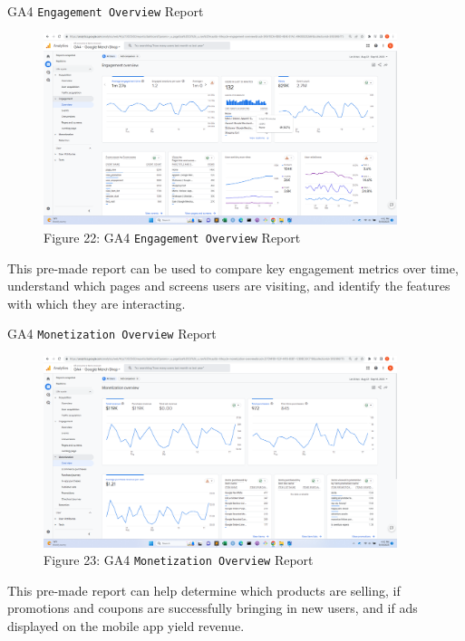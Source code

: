 \documentclass[pdf]{beamer}
\theoremstyle{remark}
\theoremstyle{definition}
\begin{document}
\begin{frame}[t]{GA4 \texttt{Engagement Overview} Report}
\begin{figure}[htbp]
  \captionsetup{justification=centering}
  \includegraphics[height=5.6cm, trim=1.5cm 0.0cm 2.0cm 0.0cm width=5.6cm]{Images/G4A_8b_091923_Engagement_Overview.png}
  \caption{Figure {\color{franklinblue} 22}: GA4 \texttt{Engagement Overview} Report}
\end{figure}
\vspace{-2.0ex}
\small 
This pre-made report can be used to compare key engagement metrics over time, understand which pages and screens users are visiting, and identify the features with which they are interacting.
\end{frame}

\begin{frame}[t]{GA4 \texttt{Monetization Overview} Report}
\begin{figure}[htbp]
  \captionsetup{justification=centering}
  \includegraphics[height=5.6cm, trim=1.5cm 0.0cm 2.0cm 0.0cm width=5.6cm]{Images/G4A_8c_091923_Monetization_Overview.png}
  \caption{Figure {\color{franklinblue} 23}: GA4 \texttt{Monetization Overview} Report}
\end{figure}
\vspace{-2.0ex}
\small 
This pre-made report can help determine which products are selling, if promotions and coupons are successfully bringing in new users, and if ads displayed on the mobile app yield revenue.
\end{frame}
\end{document}
